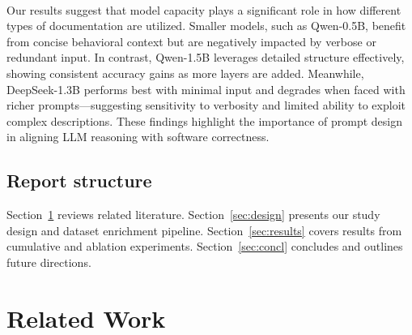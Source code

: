 \documentclass[a4paper]{usiinfbachelorproject}
\begin{document}
\\[2pt]
Our results suggest that model capacity plays a significant role in how different types of documentation are utilized. Smaller models, such as Qwen-0.5B, benefit from concise behavioral context but are negatively impacted by verbose or redundant input. In contrast, Qwen-1.5B leverages detailed structure effectively, showing consistent accuracy gains as more layers are added. Meanwhile, DeepSeek-1.3B performs best with minimal input and degrades when faced with richer prompts—suggesting sensitivity to verbosity and limited ability to exploit complex descriptions. These findings highlight the importance of prompt design in aligning LLM reasoning with software correctness.

\subsection*{Report structure}

Section~\ref{sec:related} reviews related literature.  
Section~\ref{sec:design} presents our study design and dataset enrichment pipeline.  
Section~\ref{sec:results} covers results from cumulative and ablation experiments.  
Section~\ref{sec:concl} concludes and outlines future directions.

\section{Related Work}\label{sec:related}
\end{document}
